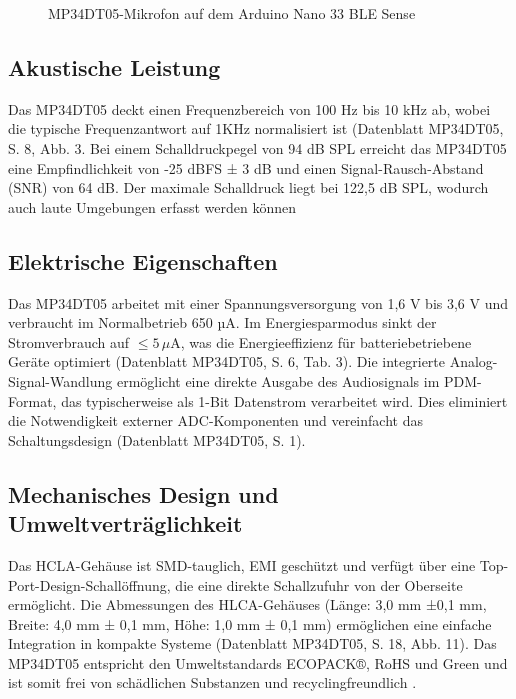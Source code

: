 \begin{figure}[h]
	\centering
	\caption{MP34DT05-Mikrofon auf dem Arduino Nano 33 BLE Sense}
	\label{fig:microphone_detail}
\end{figure}

\bigskip

\subsection{Akustische Leistung}
Das MP34DT05 deckt einen Frequenzbereich von 100 Hz bis 10 kHz ab, wobei die typische Frequenzantwort auf 1KHz normalisiert ist (Datenblatt MP34DT05, S. 8, Abb. 3. Bei einem Schalldruckpegel von 94 dB SPL erreicht das MP34DT05 eine Empfindlichkeit von -25 dBFS ± 3 dB und einen Signal-Rausch-Abstand (SNR) von 64 dB. Der maximale Schalldruck liegt bei 122,5 dB SPL, wodurch auch laute Umgebungen erfasst werden können \cite{STMicroelectronics:2021b}

\bigskip

\subsection{Elektrische Eigenschaften}
Das MP34DT05 arbeitet mit einer Spannungsversorgung von 1,6 V bis 3,6 V und verbraucht im Normalbetrieb 650 µA. Im Energiesparmodus sinkt der Stromverbrauch auf $\leq 5\,\mu\text{A}$, was die Energieeffizienz für batteriebetriebene Geräte optimiert (Datenblatt MP34DT05, S. 6, Tab. 3). Die integrierte Analog-Signal-Wandlung ermöglicht eine direkte Ausgabe des Audiosignals im PDM-Format, das typischerweise als 1-Bit Datenstrom verarbeitet wird. Dies eliminiert die Notwendigkeit externer ADC-Komponenten und vereinfacht das Schaltungsdesign (Datenblatt MP34DT05, S. 1)\cite{STMicroelectronics:2021b}.

\bigskip

\subsection{Mechanisches Design und Umweltverträglichkeit}
Das HCLA-Gehäuse ist SMD-tauglich, EMI geschützt und verfügt über eine Top-Port-Design-Schallöffnung, die eine direkte Schallzufuhr von der Oberseite ermöglicht. Die Abmessungen des HLCA-Gehäuses (Länge: 3,0 mm ±0,1 mm, Breite: 4,0 mm ± 0,1 mm, Höhe: 1,0 mm ± 0,1 mm) ermöglichen eine einfache Integration in kompakte Systeme (Datenblatt MP34DT05, S. 18, Abb. 11). Das MP34DT05 entspricht den Umweltstandards ECOPACK®, RoHS und Green und ist somit frei von schädlichen Substanzen und recyclingfreundlich \cite{STMicroelectronics:2021b}.

